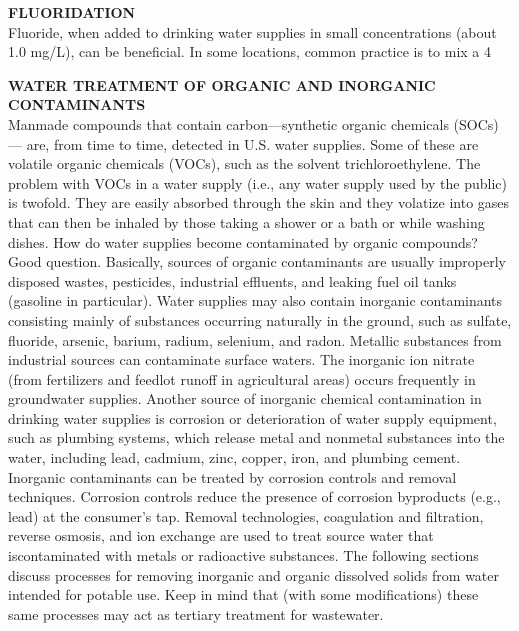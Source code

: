 \documentclass{article}
\begin{document}
\textbf{FLUORIDATION}\\
Fluoride, when added to drinking water supplies in small concentrations (about 1.0 mg/L), can be beneficial. In some locations, common practice is to mix a 4%

\textbf{WATER TREATMENT OF ORGANIC AND INORGANIC CONTAMINANTS}\\
Manmade compounds that contain carbon—synthetic organic chemicals (SOCs)— are, from time to time, detected in U.S. water supplies. Some of these are volatile organic chemicals (VOCs), such as the solvent trichloroethylene. The problem with VOCs in a water supply (i.e., any water supply used by the public) is twofold. They are easily absorbed through the skin and they volatize into gases that can then be inhaled by those taking a shower or a bath or while washing dishes. How do water supplies become contaminated by organic compounds? Good question. Basically, sources of organic contaminants are usually improperly disposed wastes, pesticides, industrial effluents, and leaking fuel oil tanks (gasoline in particular).
Water supplies may also contain inorganic contaminants consisting mainly of substances occurring naturally in the ground, such as sulfate, fluoride, arsenic, barium, radium, selenium, and radon. Metallic substances from industrial sources can contaminate surface waters. The inorganic ion nitrate (from fertilizers and feedlot runoff in agricultural areas) occurs frequently in groundwater supplies. Another source of inorganic chemical contamination in drinking water supplies is corrosion or deterioration of water supply equipment, such as plumbing systems, which release metal and nonmetal substances into the water, including lead, cadmium, zinc, copper, iron, and plumbing cement. Inorganic contaminants can be treated by corrosion controls and removal techniques. Corrosion controls reduce the presence of corrosion byproducts (e.g., lead) at the consumer’s tap. Removal technologies, coagulation and filtration, reverse osmosis, and ion exchange are used to treat source water that iscontaminated with metals or radioactive substances. The following sections discuss processes for removing inorganic and organic dissolved solids from water intended for potable use. Keep in mind that (with some modifications) these same processes may act as tertiary treatment for wastewater.\\
 
\end{document}
